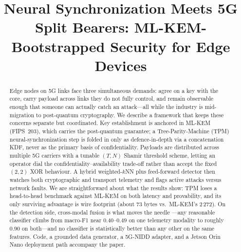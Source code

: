 \documentclass[conference]{IEEEtran}
\begin{document}
\title{Neural Synchronization Meets 5G Split Bearers: ML-KEM-Bootstrapped Security for Edge Devices}



\author{

}

\maketitle

\begin{abstract}
Edge nodes on 5G links face three simultaneous demands: agree on a
key with the core, carry payload across links they do not fully control, and remain
observable enough that someone can actually catch an attack---all while the industry
is mid-migration to post-quantum cryptography. We describe a framework that keeps
these concerns separate but coordinated. Key establishment is anchored in ML-KEM
(FIPS~203), which carries the post-quantum guarantee; a Tree-Parity-Machine (TPM)
neural-synchronization step is folded in only as defence-in-depth via a
concatenation KDF, never as the primary basis of confidentiality. Payloads are
distributed across multiple 5G carriers with a tunable $(T,N)$ Shamir threshold
scheme, letting an operator dial the confidentiality--availability trade-off rather
than accept the fixed $(2,2)$ XOR behaviour. A hybrid weighted-$k$NN plus
feed-forward detector then watches both cryptographic and transport telemetry and
flags active attacks versus network faults. We are straightforward about what the
results show: TPM loses a head-to-head benchmark against ML-KEM on both latency and
provability, and its only surviving advantage is wire footprint (about 73 bytes vs.\
ML-KEM's 2\,272). On the detection side, cross-modal fusion is what moves the needle
---any reasonable classifier climbs from macro-F1 near $0.40$--$0.49$ on one
telemetry modality to roughly $0.90$ on both---and no classifier is statistically
better than any other on the same features. Code, a grounded data generator, a
5G-NIDD adapter, and a Jetson Orin Nano deployment path accompany the paper.
\end{abstract}
\end{document}

